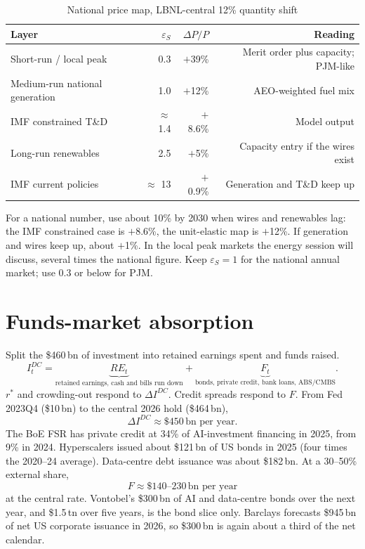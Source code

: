 \documentclass[11pt]{article}
\begin{document}
\begin{table}[H]
\centering
\caption{National price map, LBNL-central 12\% quantity shift}
\label{tab:elas}
\begin{tabular}{lrrr}
\toprule
Layer & $\varepsilon_S$ & $\Delta P/P$ & Reading \\
\midrule
Short-run / local peak & 0.3 & $+$39\% & Merit order plus capacity; PJM-like \\
Medium-run national generation & 1.0 & $+$12\% & AEO-weighted fuel mix \\
IMF constrained T\&D & $\approx$ 1.4 & $+$8.6\% & Model output \\
Long-run renewables & 2.5 & $+$5\% & Capacity entry if the wires exist \\
IMF current policies & $\approx$ 13 & $+$0.9\% & Generation and T\&D keep up \\
\bottomrule
\end{tabular}
\end{table}

For a national number, use about 10\% by 2030 when wires and renewables lag:
the IMF constrained case is $+$8.6\%, the unit-elastic map is $+$12\%. If
generation and wires keep up, about $+$1\%. In the local peak markets the
energy session will discuss, several times the national figure. Keep
$\varepsilon_S=1$ for the national annual market; use 0.3 or below for PJM.

\section{Funds-market absorption}

Split the \$460\,bn of investment into retained earnings spent and funds raised.
\begin{equation}
I_t^{DC}
=
\underbrace{RE_t}_{\text{retained earnings, cash and bills run down}}
+
\underbrace{F_t}_{\text{bonds, private credit, bank loans, ABS/CMBS}}.
\end{equation}
$r^*$ and crowding-out respond to $\Delta I^{DC}$. Credit spreads respond to
$F$. From Fed 2023Q4 (\$10\,bn) to the central 2026 hold (\$464\,bn),
\begin{equation}
\Delta I^{DC}\approx \$450\,\text{bn per year}.
\end{equation}
The BoE FSR has private credit at 34\% of AI-investment financing in 2025,
from 9\% in 2024. Hyperscalers issued about \$121\,bn of US bonds in 2025
(four times the 2020--24 average). Data-centre debt issuance was about
\$182\,bn. At a 30--50\% external share,
\begin{equation}
F \approx \$140\text{--}230\,\text{bn per year}
\end{equation}
at the central rate. Vontobel's \$300\,bn of AI and data-centre bonds over
the next year, and \$1.5\,tn over five years, is the bond slice only.
Barclays forecasts \$945\,bn of net US corporate issuance in 2026, so
\$300\,bn is again about a third of the net calendar.
\end{document}
